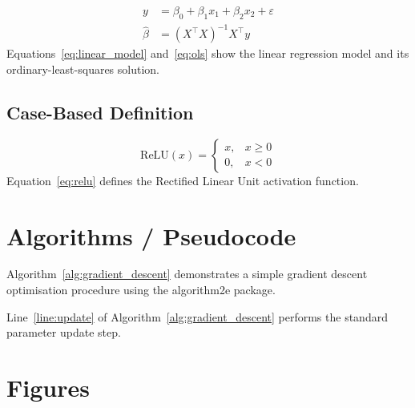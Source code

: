 \begin{align}
  y &= \beta_0 + \beta_1 x_1 + \beta_2 x_2 + \varepsilon
     \label{eq:linear_model} \\
  \hat{\beta} &= (X^\top X)^{-1} X^\top y
     \label{eq:ols}
\end{align}
Equations~\ref{eq:linear_model} and~\ref{eq:ols} show the linear
regression model and its ordinary-least-squares solution.

\subsection{Case-Based Definition}

\begin{equation}
  \text{ReLU}(x) =
  \begin{cases}
    x,  & x \geq 0 \\
    0,  & x < 0
  \end{cases}
  \label{eq:relu}
\end{equation}
Equation~\ref{eq:relu} defines the Rectified Linear Unit activation function.

\section{Algorithms / Pseudocode}
\label{sec:algorithms}

Algorithm~\ref{alg:gradient_descent} demonstrates a simple gradient
descent optimisation procedure using the algorithm2e package.

\begin{algorithm}[htbp]
  \caption{Gradient Descent Optimisation}
  \label{alg:gradient_descent}
  \;
\end{algorithm}

Line~\ref{line:update} of Algorithm~\ref{alg:gradient_descent}
performs the standard parameter update step.

\section{Figures}
\label{sec:figures}

